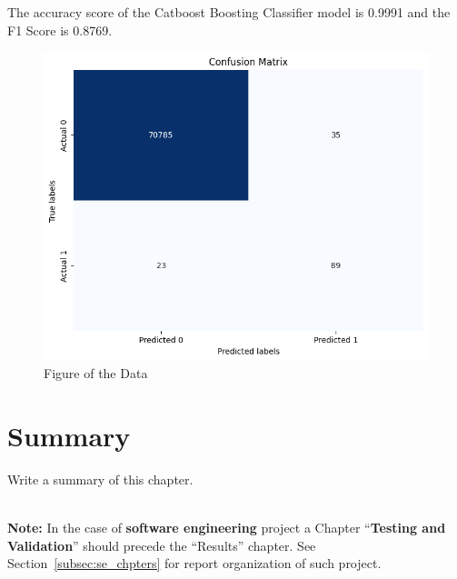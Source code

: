  The accuracy score of the Catboost Boosting Classifier model is 0.9991 and the F1 Score is 0.8769.  

\begin{figure}[ht]
    \centering
    \includegraphics[scale=0.6]{figures/CM_CatBoost.png}
    \caption{Figure of the Data}
    \label{fig:Plot of the Data}
\end{figure}

\clearpage



\section{Summary}
Write a summary of this chapter.

~\\[5em]
\noindent
{\huge\textbf{Note:}} In the case of \textbf{software engineering} project a Chapter ``\textbf{Testing and Validation}'' should precede the ``Results'' chapter. See Section~\ref{subsec:se_chpters} for report organization of such project. 

